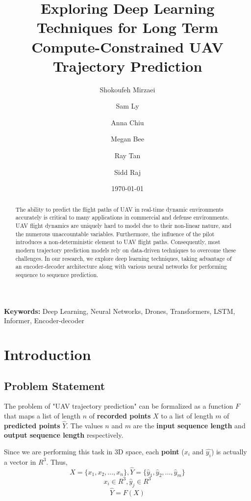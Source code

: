 \documentclass{article}
\begin{document}
\title{
    Exploring Deep Learning Techniques for Long Term Compute-Constrained UAV Trajectory Prediction
}

\author{
    Shokoufeh Mirzaei
    \and Sam Ly
    \and Anna Chiu
    \and Megan Bee
    \and Ray Tan
    \and Sidd Raj
}

\date{\today}

\maketitle

\begin{abstract}
    The ability to predict the flight paths of UAV in real-time dynamic 
    environments accurately is critical to many applications in commercial and 
    defense environments. UAV flight dynamics are uniquely hard to model due to 
    their non-linear nature, and the numerous unaccountable variables. 
    Furthermore, the influence of the pilot introduces a non-deterministic 
    element to UAV flight paths. Consequently, most  modern trajectory 
    prediction models rely on data-driven techniques to overcome these 
    challenges. In our research, we explore deep learning techniques, taking 
    advantage of an encoder-decoder architecture along with various neural 
    networks for performing sequence to sequence prediction. 
\end{abstract}

\noindent\textbf{Keywords:} Deep Learning, Neural Networks, Drones, Transformers, LSTM, Informer, Encoder-decoder

\section{Introduction}
\subsection{Problem Statement}
The problem of "UAV trajectory prediction" can be formalized as a function $F$ 
that maps a list of length $n$ of \textbf{recorded points} $X$ to a list of 
length $m$ of \textbf{predicted points} $\hat{Y}$. The values $n$ and $m$ are the 
\textbf{input sequence length} and \textbf{output sequence length} respectively.

Since we are performing this task in 3D space, each \textbf{point} ($x_i$ and 
$\hat{y_i}$) is actually a vector in $R^3$. Thus,
$$ X = \{x_1, x_2, ..., x_n\}, \hat{Y} = \{\hat{y}_1, \hat{y}_2, ..., \hat{y}_m\} $$ 
$$ x_i \in R^3, \hat{y}_j \in R^3 $$
$$ \hat{Y} = F(X) $$
\end{document}

